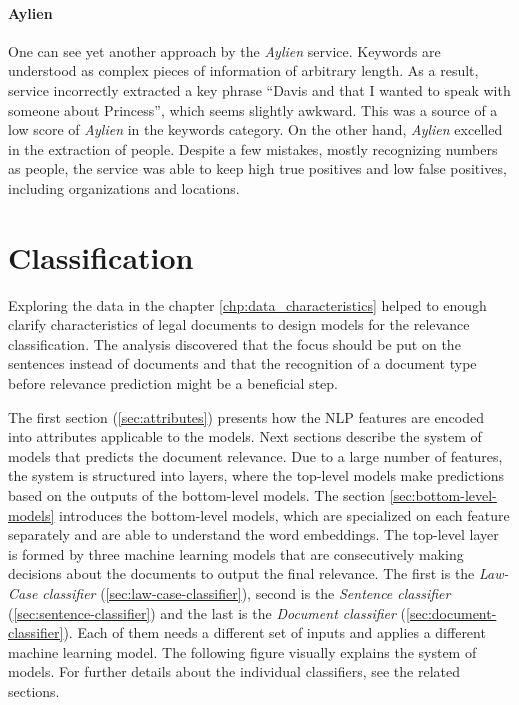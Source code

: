 \documentclass[
  digital, %
  notable,   %
  nolof,     %
  nolot,     %
]{fithesis3}
\begin{document}
\subsubsection{\textbf{Aylien}}
One can see yet another approach by the \textit{Aylien} service.
Keywords are understood as complex pieces of information of arbitrary length.
As a result, service incorrectly extracted a key phrase ``Davis and that I wanted to speak with someone about Princess'', which seems slightly awkward.
This was a source of a low score of \textit{Aylien} in the keywords category.
On the other hand, \textit{Aylien} excelled in the extraction of people.
Despite a few mistakes, mostly recognizing numbers as people, the service was able to keep high true positives and low false positives, including organizations and locations.

\chapter{Classification}
\label{chp:classification}
Exploring the data in the chapter \ref{chp:data_characteristics} helped to enough clarify characteristics of legal documents to design models for the relevance classification.
The analysis discovered that the focus should be put on the sentences instead of documents and that the recognition of a document type before relevance prediction might be a beneficial step.

The first section (\ref{sec:attributes}) presents how the NLP features are encoded into attributes applicable to the models.
Next sections describe the system of models that predicts the document relevance.
Due to a large number of features, the system is structured into layers, where the top-level models make predictions based on the outputs of the bottom-level models.
The section \ref{sec:bottom-level-models} introduces the bottom-level models, which are specialized on each feature separately and are able to understand the word embeddings.
The top-level layer is formed by three machine learning models that are consecutively making decisions about the documents to output the final relevance.
The first is the \textit{Law-Case classifier} (\ref{sec:law-case-classifier}), second is the \textit{Sentence classifier} (\ref{sec:sentence-classifier}) and the last is the \textit{Document classifier} (\ref{sec:document-classifier}).
Each of them needs a different set of inputs and applies a different machine learning model.
The following figure visually explains the system of models.
For further details about the individual classifiers, see the related sections.
\end{document}
